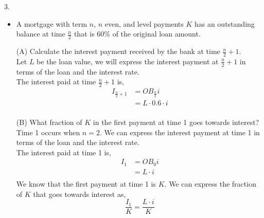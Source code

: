 \documentclass[12pt]{article}
\begin{document}
3. 
\begin{itemize}
    \item A mortgage with term $n$, $n$ even, and level payments $K$ has an outstanding balance at time $\frac{n}{2}$ that is 60\% of the original loan amount. 
    
    (A) Calculate the interest payment received by the bank at time $\frac{n}{2} + 1$.\\
    Let $L$ be the loan value, we will express the interest payment at $\frac{n}{2} +1$ in terms of the loan and the interest rate.\\
    The interest paid at time $\frac{n}{2}+1$ is,
    \begin{align*}
	    I_{\frac{n}{2}+1}&=OB_{\frac{n}{2}}i\\
			     &=L\cdot0.6\cdot i\\
    \end{align*}
    
    (B) What fraction of $K$ in the first payment at time 1 goes towards interest?\\
    Time 1 occurs when $n=2$. We can express the interest payment at time 1 in terms of the loan and the interest rate.\\
    The interest paid at time 1 is,
    \begin{align*}
	    I_1&=OB_0i\\
	       &=L\cdot i\\
       \end{align*}
       We know that the first payment at time 1 is $K$. We can express the fraction of $K$ that goes towards interest as,
       $$\frac{I_1}{K} = \frac{L\cdot i}{K}$$


\end{itemize}
\end{document}
